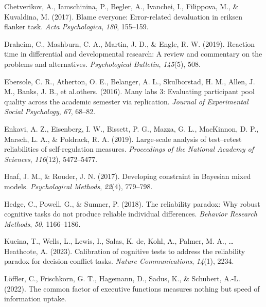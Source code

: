 \documentclass[
  man,floatsintext]{apa6}
\newlength{\cslhangindent}
\newlength{\cslentryspacingunit} %
\newenvironment{CSLReferences}[2] %
 {%
  \setlength{\parindent}{0pt}
  \ifodd #1
  \let\oldpar\par
  \def\par{\hangindent=\cslhangindent\oldpar}
  \fi
  \setlength{\parskip}{#2\cslentryspacingunit}
 }%
 {}
\begin{document}
\hypertarget{refs}{}
\begin{CSLReferences}{1}{0}
\leavevmode{}%
Chetverikov, A., Iamschinina, P., Begler, A., Ivanchei, I., Filippova, M., \& Kuvaldina, M. (2017). Blame everyone: Error-related devaluation in eriksen flanker task. \emph{Acta Psychologica}, \emph{180}, 155--159.

\leavevmode{}%
Draheim, C., Mashburn, C. A., Martin, J. D., \& Engle, R. W. (2019). Reaction time in differential and developmental research: A review and commentary on the problems and alternatives. \emph{Psychological Bulletin}, \emph{145}(5), 508.

\leavevmode{}%
Ebersole, C. R., Atherton, O. E., Belanger, A. L., Skulborstad, H. M., Allen, J. M., Banks, J. B., et al.others. (2016). Many labs 3: Evaluating participant pool quality across the academic semester via replication. \emph{Journal of Experimental Social Psychology}, \emph{67}, 68--82.

\leavevmode{}%
Enkavi, A. Z., Eisenberg, I. W., Bissett, P. G., Mazza, G. L., MacKinnon, D. P., Marsch, L. A., \& Poldrack, R. A. (2019). Large-scale analysis of test--retest reliabilities of self-regulation measures. \emph{Proceedings of the National Academy of Sciences}, \emph{116}(12), 5472--5477.

\leavevmode{}%
Haaf, J. M., \& Rouder, J. N. (2017). Developing constraint in {B}ayesian mixed models. \emph{Psychological Methods}, \emph{22}(4), 779--798.

\leavevmode{}%
Hedge, C., Powell, G., \& Sumner, P. (2018). The reliability paradox: Why robust cognitive tasks do not produce reliable individual differences. \emph{Behavior Research Methods}, \emph{50}, 1166--1186.

\leavevmode{}%
Kucina, T., Wells, L., Lewis, I., Salas, K. de, Kohl, A., Palmer, M. A., \ldots{} Heathcote, A. (2023). Calibration of cognitive tests to address the reliability paradox for decision-conflict tasks. \emph{Nature Communications}, \emph{14}(1), 2234.

\leavevmode{}%
Löffler, C., Frischkorn, G. T., Hagemann, D., Sadus, K., \& Schubert, A.-L. (2022). The common factor of executive functions measures nothing but speed of information uptake.


\end{CSLReferences}
\end{document}
